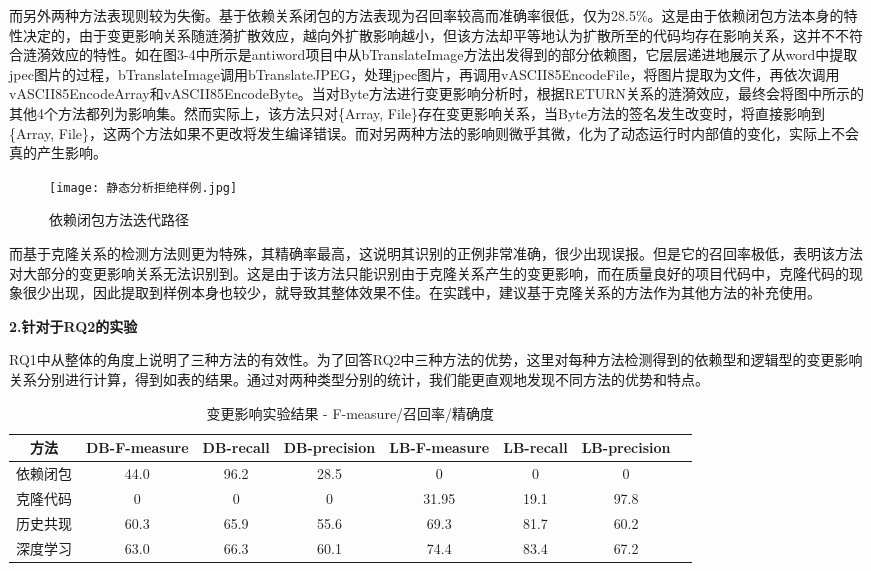 而另外两种方法表现则较为失衡。基于依赖关系闭包的方法表现为召回率较高而准确率很低，仅为28.5\%。这是由于依赖闭包方法本身的特性决定的，由于变更影响关系随涟漪扩散效应，越向外扩散影响越小，但该方法却平等地认为扩散所至的代码均存在影响关系，这并不不符合涟漪效应的特性。如在图3-4中所示是antiword项目中从bTranslateImage方法出发得到的部分依赖图，它层层递进地展示了从word中提取jpec图片的过程，bTranslateImage调用bTranslateJPEG，处理jpec图片，再调用vASCII85EncodeFile，将图片提取为文件，再依次调用vASCII85EncodeArray和vASCII85EncodeByte。当对Byte方法进行变更影响分析时，根据RETURN关系的涟漪效应，最终会将图中所示的其他4个方法都列为影响集。然而实际上，该方法只对\{Array, File\}存在变更影响关系，当Byte方法的签名发生改变时，将直接影响到\{Array, File\}，这两个方法如果不更改将发生编译错误。而对另两种方法的影响则微乎其微，化为了动态运行时内部值的变化，实际上不会真的产生影响。

\begin{figure}[h]
\centering
\texttt{[image: 静态分析拒绝样例.jpg]}
\caption{依赖闭包方法迭代路径}
\end{figure}

而基于克隆关系的检测方法则更为特殊，其精确率最高，这说明其识别的正例非常准确，很少出现误报。但是它的召回率极低，表明该方法对大部分的变更影响关系无法识别到。这是由于该方法只能识别由于克隆关系产生的变更影响，而在质量良好的项目代码中，克隆代码的现象很少出现，因此提取到样例本身也较少，就导致其整体效果不佳。在实践中，建议基于克隆关系的方法作为其他方法的补充使用。

\textbf{2.针对于RQ2的实验}

RQ1中从整体的角度上说明了三种方法的有效性。为了回答RQ2中三种方法的优势，这里对每种方法检测得到的依赖型和逻辑型的变更影响关系分别进行计算，得到如表的结果。通过对两种类型分别的统计，我们能更直观地发现不同方法的优势和特点。


\begin{table}[htbp]
\caption{变更影响实验结果 - F-measure/召回率/精确度}
\vspace{0.5em}\centering\wuhao
\begin{tabular}{cccccccc}
\toprule
方法 & DB-F-measure & DB-recall & DB-precision & LB-F-measure & LB-recall & LB-precision  \\
\midrule
依赖闭包 & 44.0 & 96.2 & 28.5 & 0 & 0 & 0 \\
克隆代码 & 0 & 0 &  0 & 31.95 & 19.1 & 97.8 \\
历史共现 & 60.3 & 65.9 & 55.6 & 69.3 & 81.7 & 60.2 \\
深度学习 & 63.0 & 66.3 & 60.1 & 74.4 & 83.4 & 67.2 \\
\bottomrule
\end{tabular}
\end{table}

